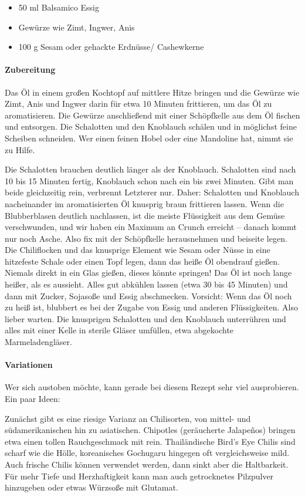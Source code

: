 \begin{itemize}[noitemsep]
	\item 50 ml Balsamico Essig
	\item Gewürze wie Zimt,  Ingwer,  Anis
	\item 100 g Sesam oder gehackte Erdnüsse/ Cashewkerne
\end{itemize}

\paragraph{Zubereitung}

Das Öl in einem großen Kochtopf auf mittlere Hitze bringen und die Gewürze 
wie Zimt,  Anis und Ingwer darin für etwa 10 Minuten frittieren, um das Öl zu 
aromatisieren. Die Gewürze anschließend mit einer Schöpfkelle aus dem Öl 
fischen und entsorgen.
Die Schalotten und den Knoblauch schälen und in möglichst feine Scheiben 
schneiden. Wer einen feinen Hobel oder eine Mandoline hat, nimmt sie zu Hilfe. 

Die Schalotten brauchen deutlich länger als der Knoblauch. Schalotten sind 
nach 10 bis 15 Minuten fertig, Knoblauch schon nach ein bis zwei Minuten. Gibt 
man beide gleichzeitig rein, verbrennt Letzterer nur. Daher: Schalotten und 
Knoblauch nacheinander im aromatisierten Öl knusprig braun frittieren lassen. 
Wenn die Blubberblasen deutlich nachlassen, ist die meiste Flüssigkeit aus 
dem Gemüse verschwunden, und wir haben ein Maximum an Crunch erreicht – 
danach kommt nur noch Asche. Also fix mit der Schöpfkelle herausnehmen und 
beiseite legen.
Die Chiliflocken und das knusprige Element wie Sesam oder Nüsse in eine 
hitzefeste Schale oder einen Topf legen, dann das heiße Öl obendrauf gießen. 
Niemals direkt in ein Glas gießen, dieses könnte springen! Das Öl ist noch lange 
heißer, als es aussieht.
Alles gut abkühlen lassen (etwa 30 bis 45 Minuten) und dann mit Zucker, 
Sojasoße und Essig abschmecken. Vorsicht: Wenn das Öl noch zu heiß ist, 
blubbert es bei der Zugabe von Essig und anderen Flüssigkeiten. Also lieber 
warten.
Die knusprigen Schalotten und den Knoblauch unterrühren und alles mit einer 
Kelle in sterile Gläser umfüllen, etwa abgekochte Marmeladengläser.
\paragraph{Variationen} Wer sich austoben möchte, kann gerade bei diesem 
Rezept sehr viel ausprobieren. Ein paar Ideen:

Zunächst gibt es eine riesige Varianz an Chilisorten, von mittel- und 
südamerikanischen hin zu asiatischen. Chipotles (geräucherte Jalapeños) 
bringen etwa einen tollen Rauchgeschmack mit rein. Thailändische Bird’s Eye 
Chilis sind scharf wie die Hölle, koreanisches Gochugaru hingegen oft 
vergleichsweise mild. Auch frische Chilis können verwendet werden, dann sinkt 
aber die Haltbarkeit.
Für mehr Tiefe und Herzhaftigkeit kann man auch getrocknetes Pilzpulver 
hinzugeben oder etwas Würzsoße mit Glutamat.

